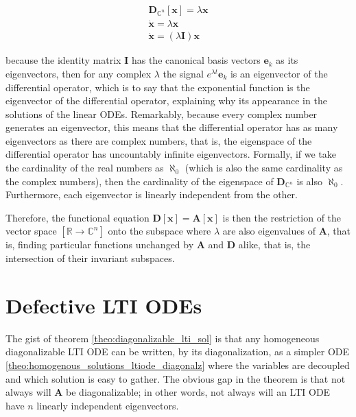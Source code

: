 \begin{gather}
	\mathbf{D}_{\mathbb{C}^n}\left[\mathbf{x}\right] = \lambda\mathbf{x}\nonumber\\[5mm]
	\dot{\mathbf{x}} = \lambda\mathbf{x}\nonumber\\[5mm]
	\dot{\mathbf{x}} = \left(\lambda \mathbf{I}\right)\mathbf{x}
\end{gather}

	\noindent because the identity matrix $\mathbf{I}$ has the canonical basis vectors $\mathbf{e}_k$ as its eigenvectors, then for any complex $\lambda$ the signal $e^{\lambda t}\mathbf{e}_k$ is an eigenvector of the differential operator, which is to say that the exponential function is the eigenvector of the differential operator, explaining why its appearance in the solutions of the linear ODEs. Remarkably, because every complex number generates an eigenvector, this means that the differential operator has as many eigenvectors as there are complex numbers, that is, the eigenspace of the differential operator has uncountably infinite eigenvectors. Formally, if we take the cardinality of the real numbers as $\aleph_0$ (which is also the same cardinality as the complex numbers), then the cardinality of the eigenspace of $\mathbf{D}_{\mathbb{C}^n}$ is also $\aleph_0$. Furthermore, each eigenvector is linearly independent from the other.

 	Therefore, the functional equation $\mathbf{D}\left[\mathbf{x}\right] = \mathbf{A}\left[\mathbf{x}\right]$ is then the restriction of the vector space $\left[\mathbb{R}\to\mathbb{C}^n\right]$ onto the subspace where $\lambda$ are also eigenvalues of $\mathbf{A}$, that is, finding particular functions unchanged by $\mathbf{A}$ and $\mathbf{D}$ alike, that is, the intersection of their invariant subspaces.

\section{Defective LTI ODEs} %

	The gist of theorem \ref{theo:diagonalizable_lti_sol} is that any homogeneous diagonalizable LTI ODE can be written, by its diagonalization, as a simpler ODE \eqref{theo:homogenous_solutions_ltiode_diagonalz} where the variables are decoupled and which solution is easy to gather. The obvious gap in the theorem is that not always will $\mathbf{A}$ be diagonalizable; in other words, not always will an LTI ODE have $n$ linearly independent eigenvectors.


